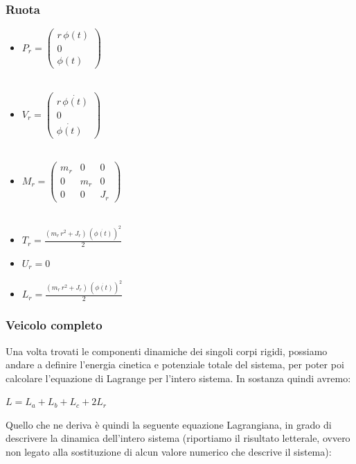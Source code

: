\subsubsection{Ruota}
\begin{itemize}
	
	\item \textbf{$P_r = \left(\begin{array}{c}
		r\,\phi \left(t\right)\\
		0\\
		\phi \left(t\right)
		\end{array}\right)$}
	\\\\
	\item \textbf{$V_r = \left(\begin{array}{c}
		r\,\dot{\phi \left(t\right)}\\
		0\\
		\dot{\phi \left(t\right)}
		\end{array}\right)$}
	\\\\
	\item \textbf{$M_r = \left(\begin{array}{ccc}
		m_r  & 0 & 0\\
		0 & m_r  & 0\\
		0 & 0 & J_r 
		\end{array}\right)$} \label{matrix:mr}
	\\\\
	\item \textbf{$T_r = \frac{{\left(m_r \,r^2 +J_r \right)}\,{{\left(\dot{\phi \left(t\right)}\right)}}^2 }{2}$}
	\\
	\item \textbf{$U_r = 0$}
	\\
	\item \textbf{$L_r = \frac{{\left(m_r \,r^2 +J_r \right)}\,{{\left(\dot{\phi \left(t\right)}\right)}}^2 }{2}$}
\end{itemize}

\subsubsection{Veicolo completo}
Una volta trovati le componenti dinamiche dei singoli corpi rigidi, possiamo andare a definire l'energia cinetica e potenziale totale del sistema, per poter poi calcolare l'equazione di Lagrange per l'intero sistema.
In sostanza quindi avremo:
\begin{center}
	$L = L_a + L_b + L_c + 2 L_r$
\end{center}
Quello che ne deriva è quindi la seguente equazione Lagrangiana, in grado di descrivere la dinamica dell'intero sistema (riportiamo il risultato letterale, ovvero non legato alla sostituzione di alcun valore numerico che descrive il sistema):



